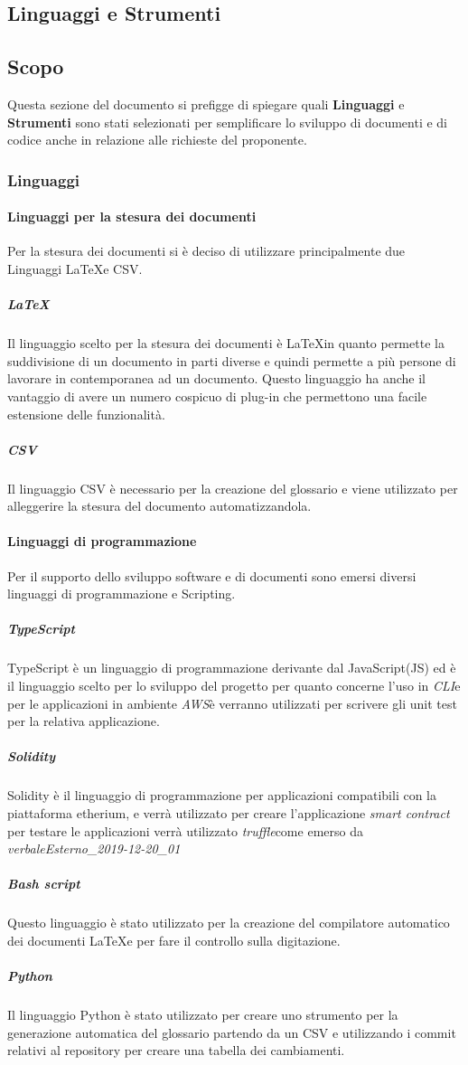 \subsection{Linguaggi e Strumenti}
\subsection{Scopo}
Questa sezione del documento si prefigge di spiegare quali \textbf{Linguaggi} e
\textbf{Strumenti} sono stati selezionati per semplificare lo sviluppo di documenti
e di codice anche in relazione alle richieste del proponente.
\subsubsection{Linguaggi}
\paragraph{Linguaggi per la stesura dei documenti}
  Per la stesura dei documenti si è deciso di utilizzare principalmente due Linguaggi
\LaTeX e CSV\glos.
\subparagraph{\LaTeX}
Il linguaggio scelto per la stesura dei documenti è \LaTeX \space in quanto permette
la suddivisione di un documento in parti diverse e quindi permette a più persone
di lavorare in contemporanea ad un documento.
Questo linguaggio ha anche il vantaggio di avere un numero cospicuo di plug-in
che permettono una facile estensione delle funzionalità.
\subparagraph{CSV}
Il linguaggio CSV è necessario per la creazione del glossario e viene utilizzato
per alleggerire la stesura del documento automatizzandola.
\paragraph{Linguaggi di programmazione}
Per il supporto dello sviluppo software e di documenti sono emersi diversi linguaggi
di programmazione e Scripting.
\subparagraph{TypeScript}
TypeScript è un linguaggio di programmazione derivante dal JavaScript(JS) ed è il
linguaggio scelto per lo sviluppo del progetto per quanto concerne l'uso in
\textit{CLI}\glo e per le applicazioni in ambiente \textit{AWS}\glo è verranno utilizzati
per scrivere gli unit test per la relativa applicazione.
\subparagraph{Solidity}
Solidity è il linguaggio di programmazione per applicazioni compatibili con la
piattaforma etherium, e verrà utilizzato per creare l'applicazione \textit{smart contract}\glo
per testare le applicazioni verrà utilizzato \textit{truffle}\glo come emerso
da \textit{verbaleEsterno\_2019-12-20\_01}
\subparagraph{Bash script}
Questo linguaggio è stato utilizzato per la creazione del compilatore automatico
dei documenti \LaTeX e per fare il controllo sulla digitazione.
\subparagraph{Python}
Il linguaggio Python è stato utilizzato per creare uno strumento per la generazione
automatica del glossario partendo da un CSV e utilizzando i commit relativi
al repository per creare una tabella dei cambiamenti.

